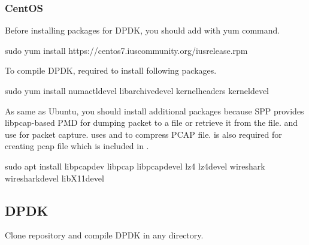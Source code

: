 \documentclass[a4paper,11pt,openany,oneside,english]{sphinxmanual}
\begin{document}
\subsubsection{CentOS}
\label{\detokenize{gsg/install:centos}}
Before installing packages for DPDK, you should add
with yum command.

\begin{sphinxVerbatim}[commandchars=\\\{\},formatcom=\footnotesize]
 sudo yum install https://centos7.iuscommunity.org/ius\PYGZhy{}release.rpm
\end{sphinxVerbatim}

To compile DPDK, required to install following packages.

\begin{sphinxVerbatim}[commandchars=\\\{\},formatcom=\footnotesize]
 sudo yum install numactl\PYGZhy{}devel 
  libarchive\PYGZhy{}devel 
  kernel\PYGZhy{}headers 
  kernel\PYGZhy{}devel
\end{sphinxVerbatim}

As same as Ubuntu, you should install additional packages because
SPP provides libpcap-based PMD for dumping packet to a file or retrieve
it from the file.
 and  use  for packet capture.
 uses  and  to compress PCAP file.
 is also required for creating pcap file which is included in .

\begin{sphinxVerbatim}[commandchars=\\\{\},formatcom=\footnotesize]
 sudo apt install libpcap\PYGZhy{}dev 
  libpcap 
  libpcap\PYGZhy{}devel 
  lz4 
  lz4\PYGZhy{}devel 
  wireshark 
  wireshark\PYGZhy{}devel 
  libX11\PYGZhy{}devel
\end{sphinxVerbatim}


\subsection{DPDK}
\label{\detokenize{gsg/install:dpdk}}\label{\detokenize{gsg/install:setup-install-dpdk}}
Clone repository and compile DPDK in any directory.
\end{document}
